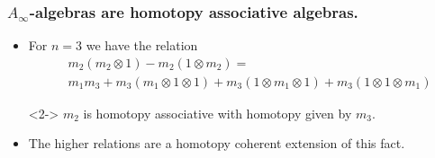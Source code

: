\documentclass{beamer}
\theoremstyle{definition}
\begin{document}
\begin{frame}
\frametitle{$A_\infty$-algebras are homotopy associative algebras.}
\begin{itemize}
\item<1-> For $n=3$ we have the relation
\begin{align*}
&m_2(m_2\otimes 1)-m_2(1\otimes m_2)=\\ %
&m_1m_3+m_3(m_1\otimes 1\otimes 1)+m_3(1\otimes m_1\otimes 1)+m_3(1\otimes 1\otimes m_1)
\end{align*}
\item[]<2-> $m_2$ is homotopy associative with homotopy given by $m_3$. %
\item<3-> The higher relations are a homotopy coherent extension of this fact. %
\end{itemize}
\end{frame}
%
%
%
%
\end{document}
